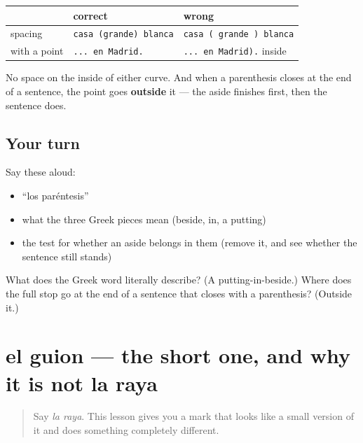 \begin{grammarlens}[title={Grammar Lens: spacing, and where the point goes}]
\noindent
\begin{tabularx}{\linewidth}{@{}>{\raggedright\arraybackslash}X>{\raggedright\arraybackslash}X>{\raggedright\arraybackslash}X@{}}
\toprule
\textbf{} & \textbf{correct} & \textbf{wrong} \\
\midrule
spacing & \texttt{casa (grande) blanca} & \texttt{casa ( grande ) blanca} \\
with a point & \texttt{... en Madrid.} & \texttt{... en Madrid).} inside \\
\bottomrule
\end{tabularx}

No space on the inside of either curve. And when a parenthesis closes at the end of a sentence, the point goes \textbf{outside} it — the aside finishes first, then the sentence does.
\end{grammarlens}

\subsection*{Your turn}
Say these aloud:

\begin{itemize}
\raggedright
  \item \textquotedblleft{}los paréntesis\textquotedblright{}
  \item what the three Greek pieces mean (beside, in, a putting)
  \item the test for whether an aside belongs in them (remove it, and see whether the sentence still stands)
\end{itemize}

\begin{tcolorbox}[breakable,colback=teal!4,colframe=teal!35!black,title={Before you move on}]
What does the Greek word literally describe? (A putting-in-beside.) Where does the full stop go at the end of a sentence that closes with a parenthesis? (Outside it.)
\end{tcolorbox}
\section[el guion]{el guion — the short one, and why it is not la raya}

\label{lesson:ES-C424-guion}



\begin{quote}
Say \emph{la raya}. This lesson gives you a mark that looks like a small version of it and does something completely different.
\end{quote}

